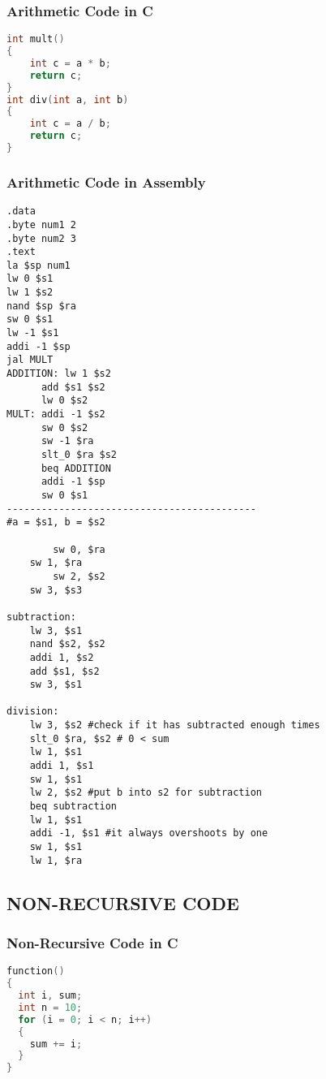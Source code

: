 \documentclass[11pt, titlepage]{article}
\begin{document}
    \subsubsection{Arithmetic Code in C}
    \begin{lstlisting}[language = C]
int mult()
{
	int c = a * b;
	return c;
}
int div(int a, int b)
{
	int c = a / b;
	return c;
}
\end{lstlisting}
    \subsubsection{Arithmetic Code in Assembly}
	\begin{lstlisting}[language=Ant]
.data 
.byte num1 2
.byte num2 3
.text
la $sp num1
lw 0 $s1
lw 1 $s2
nand $sp $ra
sw 0 $s1
lw -1 $s1
addi -1 $sp 
jal MULT
ADDITION: lw 1 $s2	
	  add $s1 $s2
	  lw 0 $s2
MULT: addi -1 $s2
      sw 0 $s2
      sw -1 $ra
      slt_0 $ra $s2
      beq ADDITION
      addi -1 $sp
      sw 0 $s1
-------------------------------------------
#a = $s1, b = $s2

        sw 0, $ra
	sw 1, $ra
        sw 2, $s2
	sw 3, $s3

subtraction:
	lw 3, $s1
	nand $s2, $s2
	addi 1, $s2
	add $s1, $s2
	sw 3, $s1

division:
	lw 3, $s2 #check if it has subtracted enough times
	slt_0 $ra, $s2 # 0 < sum
	lw 1, $s1
	addi 1, $s1
	sw 1, $s1
	lw 2, $s2 #put b into s2 for subtraction
	beq subtraction
	lw 1, $s1
	addi -1, $s1 #it always overshoots by one
	sw 1, $s1
	lw 1, $ra

\end{lstlisting}
    \subsection{NON-RECURSIVE CODE}
    \subsubsection{Non-Recursive Code in C}
   \begin{lstlisting}[language = C]
function()
{
  int i, sum;
  int n = 10;
  for (i = 0; i < n; i++)
  {
    sum += i;
  }
}
   \end{lstlisting}
\end{document}
